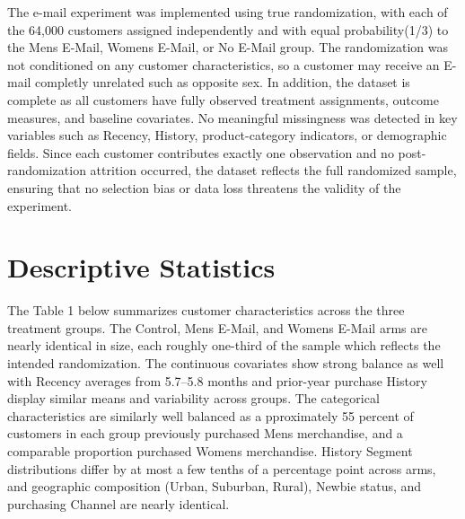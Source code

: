\documentclass[10pt]{article}
\begin{document}
The e-mail experiment was implemented using true randomization, with each of the 64,000 customers assigned independently and with equal probability(1/3) to the Mens E-Mail, Womens E-Mail, or No E-Mail group. The randomization was not conditioned on any customer characteristics, so a customer may receive an E-mail completly unrelated such as opposite sex. In addition, the dataset is complete as  all customers have fully observed treatment assignments, outcome measures, and baseline covariates. No meaningful missingness was detected in key variables such as Recency, History, product-category indicators, or demographic fields. Since each customer contributes exactly one observation and no post-randomization attrition occurred, the dataset reflects the full randomized sample, ensuring that no selection bias or data loss threatens the validity of the experiment.


\section{Descriptive Statistics}

The Table 1 below summarizes customer characteristics across the three treatment groups. The Control, Mens E-Mail, and Womens E-Mail arms are nearly identical in size, each roughly one-third of the sample which reflects the intended randomization. The continuous covariates show strong balance as well with Recency averages from 5.7–5.8 months and prior-year purchase History display similar means and variability across groups. The categorical characteristics are similarly well balanced as a pproximately 55 percent of customers in each group previously purchased Mens merchandise, and a comparable proportion purchased Womens merchandise. History Segment distributions differ by at most a few tenths of a percentage point across arms, and geographic composition (Urban, Suburban, Rural), Newbie status, and purchasing Channel are nearly identical.
\end{document}
